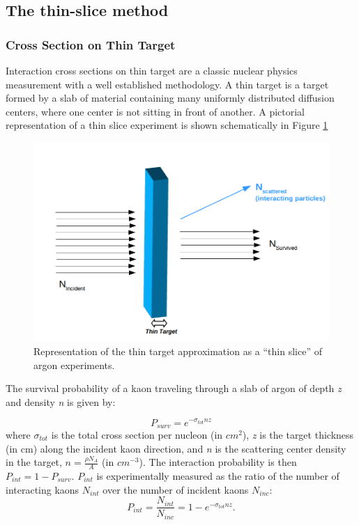 \label{sec:BeamlineKStrategy}
\subsection{The thin-slice method}
\label{sec:KXSStrategy}
\subsubsection{Cross Section on Thin Target}\label{sec:thinTargetXS}
Interaction cross sections on thin target are a classic nuclear physics measurement with a well established methodology. A thin target is a target formed by a slab of material containing many uniformly distributed diffusion centers, where  one center is not sitting in front of another.
A pictorial representation of a thin slice experiment is shown schematically in Figure \ref{fig:thinslice}

\begin{figure}[htb]
\centering
\includegraphics[scale=0.25]{./images/ThinTarget.png}
\caption{Representation of the thin target approximation as a ``thin slice'' of argon experiments.}
\label{fig:thinslice}
\end{figure}

 The survival probability of a kaon traveling through a slab of argon of depth {\it z} and density {\it n} is given by:

\begin{equation}
P_{surv} = e^{-\sigma_{tot}n z}
\end{equation} 
where $\sigma_{tot}$ is the total cross section per nucleon (in $cm^2$), {\textit
{z}} is the target thickness (in cm) along the incident kaon direction, and {\textit
{n}} is the scattering center density in the target, $n=\frac{\rho N_{A} }{A}$ (in $cm^{-3}$). The interaction probability is then $P_{int} = 1 - P_{surv}$. $P_{int}$ is experimentally measured as the ratio of the number of interacting kaons $N_{int}$ over the number of incident kaons $N_{inc}$:
\begin{equation}
P_{int}=\frac{N_{int}}{N_{inc}}=1-e^{-\sigma_{tot}n z}.
\end{equation}

